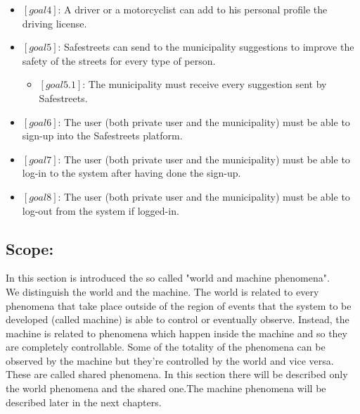 \documentclass[titlepage]{article}
\begin{document}
\begin{itemize}
\item $[goal 4]$: A driver or a motorcyclist can add to his 					  personal profile the driving license.\\

\item $[goal 5]$: Safestreets can send to the municipality 						  suggestions to improve the safety of the 					      streets for every type of person.
	\begin{itemize}
	\item $[goal 5.1]$: The municipality must receive every 
					    suggestion sent by Safestreets.\\
					   
	
	\end{itemize}
\item $[goal 6]$: The user (both private user and the municipality) must be able to sign-up into the Safestreets platform.
\item $[goal 7]$: The user (both private user and the municipality) must be able to log-in to the system after having done the sign-up.
\item $[goal 8]$: The user (both private user and the municipality) must be able to log-out from the system if logged-in.
\end{itemize}

\subsection{Scope:}
In this section is introduced the so called "world and machine phenomena".\\
We distinguish the world and the machine. The world is related to every phenomena that take place outside of the region of events that the system to be developed (called machine) is able to control or eventually observe. Instead, the machine is related to phenomena which happen inside the machine and so they are completely controllable. Some of the totality of the phenomena can be observed by the machine but they're controlled by the world and vice versa. These are called shared phenomena. In this section there will be described only the world phenomena and the shared one.The machine phenomena will be described later in the next chapters.
\end{document}
